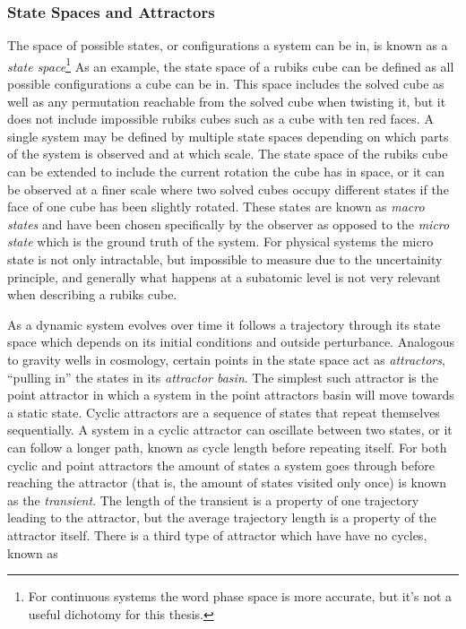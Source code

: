 \subsubsection{State Spaces and Attractors}
The space of possible states, or configurations a system can be in, is known as a
\emph{state space}\footnote{For continuous systems the word phase space is more
  accurate, but it's not a useful dichotomy for this thesis.}
As an example, the state space of a rubiks cube can be defined as all possible
configurations a cube can be in.
This space includes the solved cube as well as any permutation reachable from
the solved cube when twisting it, but it does not include impossible rubiks
cubes such as a cube with ten red faces.
A single system may be defined by multiple state spaces depending on which parts
of the system is observed and at which scale.
The state space of the rubiks cube can be extended to include the current
rotation the cube has in space, or it can be observed at a finer scale where two
solved cubes occupy different states if the face of one cube has been slightly
rotated.
These states are known as \emph{macro states} and have been chosen specifically
by the observer as opposed to the \emph{micro state} which is the ground truth
of the system.
For physical systems the micro state is not only intractable, but impossible to
measure due to the uncertainity principle, and generally what happens at a
subatomic level is not very relevant when describing a rubiks cube.\par
%
As a dynamic system evolves over time it follows a trajectory through its state
space which depends on its initial conditions and outside perturbance.
Analogous to gravity wells in cosmology, certain points in the state space act
as \emph{attractors}, ``pulling in'' the states in its \emph{attractor basin}.
The simplest such attractor is the point attractor in which a system in the
point attractors basin will move towards a static state.
Cyclic attractors are a sequence of states that repeat themselves sequentially.
A system in a cyclic attractor can oscillate between two states, or it can
follow a longer path, known as cycle length before repeating itself.
For both cyclic and point attractors the amount of states a system goes through
before reaching the attractor (that is, the amount of states visited only once)
is known as the \emph{transient}.
The length of the transient is a property of one trajectory leading to the
attractor, but the average trajectory length is a property of the attractor
itself.
There is a third type of attractor which have have no cycles, known as
